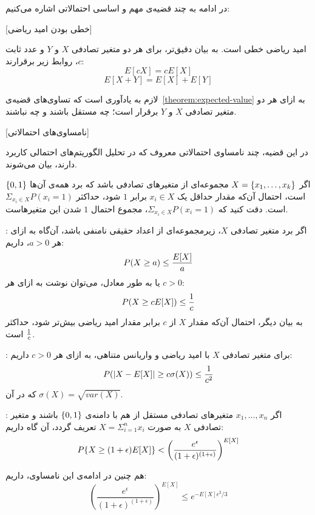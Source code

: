 در ادامه به چند قضیه‌ی مهم و اساسی احتمالاتی اشاره می‌کنیم:

[خطی بودن امید ریاضی]
\label{theorem:expected-value}

امید ریاضی خطی است. به بیان دقیق‌تر، برای هر دو متغیر تصادفی $X$ و $Y$ و عدد ثابت $c$، روابط زیر برقرارند:
$$E[c X] = c E [X]$$
$$E[X + Y] = E[X] + E[Y]$$


لازم به یادآوری است که تساوی‌های قضیه‌ی~\ref{theorem:expected-value} به ازای هر دو متغیر تصادفی $X$ و $Y$ برقرار است؛ چه مستقل باشند و چه نباشند.

[نامساوی‌های احتمالاتی]

در این قضیه، چند نامساوی احتمالاتی معروف که در تحلیل الگوریتم‌های احتمالی کاربرد دارند، بیان می‌شوند.


 اگر $X = {\{ x_1, \ldots, x_k \}}$ مجموعه‌ای از متغیر‌های تصادفی باشد که برد همه‌ی آن‌ها ${\{ 0, 1 \}}$ است، احتمال آن‌که مقدار حد‌اقل یک $x_i \in X$ برابر $1$ شود، حد‌اکثر $\Sigma_{x_i \in X} P(x_i = 1)$ است. دقت کنید که $\Sigma_{x_i \in X} P(x_i = 1)$، مجموع احتمال $1$ شدن این متغیر‌هاست.

 :
اگر برد متغیر تصادفی $X$، زیر‌مجموعه‌ای از اعداد حقیقی نامنفی باشد، آن‌گاه به ازای هر $a > 0$، داریم:
$$P(X \geq a) \leq {{E[X]} \over {a}}$$
یا به طور معادل، می‌توان نوشت به ازای هر $c > 0$:
$$P(X \geq c E[X]) \leq {{1} \over {c}}$$
به بیان دیگر، احتمال آن‌که مقدار $X$ از $c$ برابر مقدار امید ریاضی بیش‌تر شود، حد‌اکثر ${1} \over {c}$ است.

 :
برای متغیر تصادفی $X$ با امید ریاضی و واریانس متناهی، به ازای هر $c > 0$ داریم:
$$P(|X - E[X]| \geq c \sigma(X)) \leq {{1} \over {c ^ 2}}$$
که در آن $\sigma(X) = \sqrt{var(X)}$.

 :
اگر $x_1, \ldots, x_n$
متغیرهای تصادفی مستقل از هم با دامنه‌ی ${\{ 0, 1 \}}$  باشند و متغیر تصادفی $X$ به صورت 
$X = \Sigma_{i = 1}^n x_i$
تعریف گردد، آن گاه داریم:
$$P{\{ X \geq (1+\epsilon)E[X] \}} < \left({{e^{\epsilon}}\over{(1+\epsilon)^{(1+\epsilon)}}}\right)^{E[X]}$$

هم چنین در ادامه‌ی این نامساوی، داریم:
$$(\frac{e^{\epsilon}}{(1+\epsilon)^{(1+\epsilon)}})^{E[X]} \leq e^{-{E[X]}\epsilon^2/3}$$



